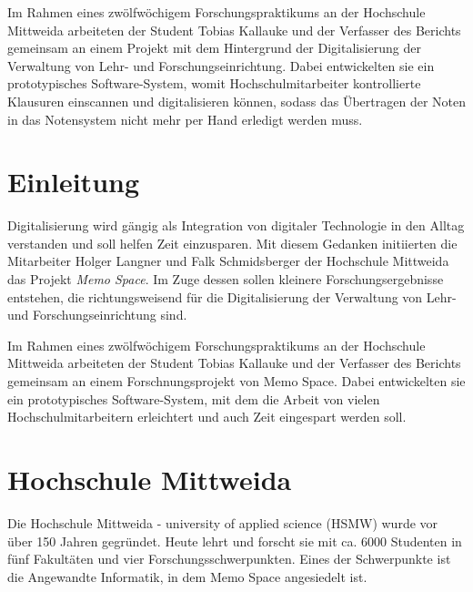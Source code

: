\documentclass[notables, nomenclature, oneside, 150]{HSMW-Thesis}
\begin{document}
\begin{Referat}
Im Rahmen eines zwölfwöchigem Forschungspraktikums an der Hochschule Mittweida arbeiteten der Student Tobias Kallauke und der Verfasser des Berichts gemeinsam an einem Projekt mit dem Hintergrund der Digitalisierung der Verwaltung von Lehr- und Forschungseinrichtung. Dabei entwickelten sie ein prototypisches Software-System, womit Hochschulmitarbeiter kontrollierte Klausuren einscannen und digitalisieren können, sodass das Übertragen der Noten in das Notensystem nicht mehr per Hand erledigt werden muss. 
\end{Referat}


\Hauptteil


\chapter{Einleitung}
	Digitalisierung wird gängig als Integration von digitaler Technologie in den Alltag verstanden und soll helfen Zeit einzusparen. Mit diesem Gedanken initiierten die Mitarbeiter Holger Langner und Falk Schmidsberger der Hochschule Mittweida das Projekt \textit{Memo Space}. Im Zuge dessen sollen kleinere Forschungsergebnisse entstehen, die richtungsweisend für die Digitalisierung der Verwaltung von Lehr- und Forschungseinrichtung sind.

	Im Rahmen eines zwölfwöchigem Forschungspraktikums an der Hochschule Mittweida arbeiteten der Student Tobias Kallauke und der Verfasser des Berichts gemeinsam an einem Forschnungsprojekt von Memo Space. Dabei entwickelten sie ein prototypisches Software-System, mit dem die Arbeit von vielen Hochschulmitarbeitern erleichtert und auch Zeit eingespart werden soll.


\chapter{Hochschule Mittweida}
	Die Hochschule Mittweida - university of applied science (HSMW)  wurde vor über 150 Jahren gegründet. Heute lehrt und forscht sie mit ca. 6000 Studenten in fünf Fakultäten und vier Forschungsschwerpunkten\cite{hochschule_mittweida_hochschule_nodate}. Eines der Schwerpunkte ist die Angewandte Informatik, in dem Memo Space angesiedelt ist.
	
\end{document}
